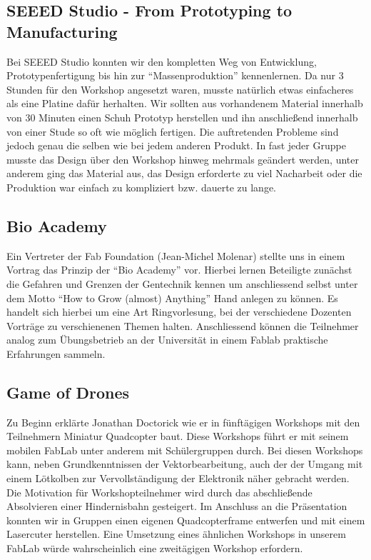 \documentclass{\basedir/fablab-document}
\begin{document}
\subsection*{SEEED Studio - From Prototyping to Manufacturing}

Bei SEEED Studio konnten wir den kompletten Weg von Entwicklung,
Prototypenfertigung bis hin zur ``Massenproduktion'' kennenlernen. Da
nur 3 Stunden für den Workshop angesetzt waren, musste natürlich etwas
einfacheres als eine Platine dafür herhalten. Wir sollten aus
vorhandenem Material innerhalb von 30 Minuten einen Schuh Prototyp
herstellen und ihn anschließend innerhalb von einer Stude so oft wie
möglich fertigen. Die auftretenden Probleme sind jedoch genau die selben
wie bei jedem anderen Produkt. In fast jeder Gruppe musste das Design
über den Workshop hinweg mehrmals geändert werden, unter anderem ging
das Material aus, das Design erforderte zu viel Nacharbeit oder die
Produktion war einfach zu kompliziert bzw. dauerte zu lange.

\subsection*{Bio Academy}

Ein Vertreter der Fab Foundation (Jean-Michel Molenar) stellte uns in
einem Vortrag das Prinzip der ``Bio Academy'' vor. Hierbei lernen
Beteiligte zunächst die Gefahren und Grenzen der Gentechnik kennen um
anschliessend selbst unter dem Motto ``How to Grow (almost) Anything''
Hand anlegen zu können. Es handelt sich hierbei um eine Art
Ringvorlesung, bei der verschiedene Dozenten Vorträge zu verschienenen
Themen halten. Anschliessend können die Teilnehmer analog zum
Übungsbetrieb an der Universität in einem Fablab praktische Erfahrungen
sammeln.

\subsection*{Game of Drones}

Zu Beginn erklärte Jonathan Doctorick wie er in fünftägigen Workshops
mit den Teilnehmern Miniatur Quadcopter baut. Diese Workshops führt er
mit seinem mobilen FabLab unter anderem mit Schülergruppen durch. Bei
diesen Workshops kann, neben Grundkenntnissen der Vektorbearbeitung,
auch der der Umgang mit einem Lötkolben zur Vervollständigung der
Elektronik näher gebracht werden. Die Motivation für Workshopteilnehmer
wird durch das abschließende Absolvieren einer Hindernisbahn gesteigert.
Im Anschluss an die Präsentation konnten wir in Gruppen einen eigenen
Quadcopterframe entwerfen und mit einem Lasercuter herstellen. Eine
Umsetzung eines ähnlichen Workshops in unserem FabLab würde
wahrscheinlich eine zweitägigen Workshop erfordern.
\end{document}
